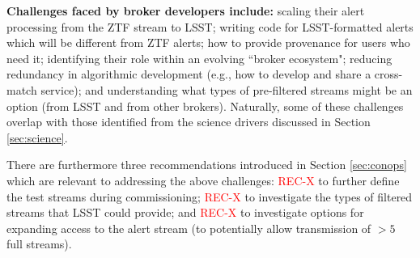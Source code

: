 {\bf Challenges faced by broker developers include:} scaling their alert processing from the ZTF stream to LSST; writing code for LSST-formatted alerts which will be different from ZTF alerts; how to provide provenance for users who need it; identifying their role within an evolving ``broker ecosystem"; reducing redundancy in algorithmic development (e.g., how to develop and share a cross-match service); and understanding what types of pre-filtered streams might be an option (from LSST and from other brokers).
Naturally, some of these challenges overlap with those identified from the science drivers discussed in Section \ref{sec:science}.




There are furthermore three recommendations introduced in Section \ref{sec:conops} which are relevant to addressing the above challenges: \textcolor{red}{REC-X} to further define the test streams during commissioning; \textcolor{red}{REC-X} to investigate the types of filtered streams that LSST could provide; and \textcolor{red}{REC-X} to investigate options for expanding access to the alert stream (to potentially allow transmission of $>5$ full streams).




